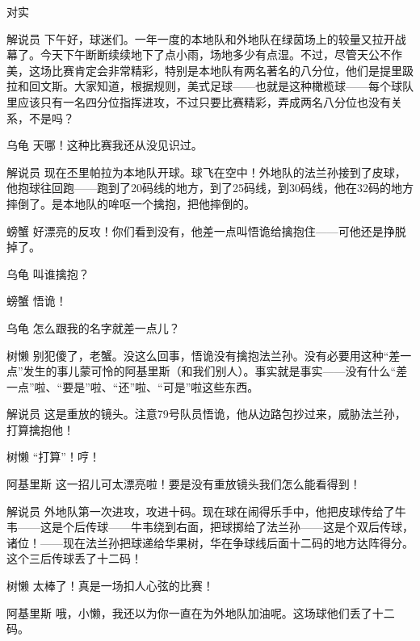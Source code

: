 \begin{dialog}{对实}
\begin{dialogue}
\item[解说员]下午好，球迷们。一年一度的本地队和外地队在绿茵场上的较量又拉开战幕了。今天下午断断续续地下了点小雨，场地多少有点湿。不过，尽管天公不作美，这场比赛肯定会非常精彩，特别是本地队有两名著名的八分位，他们是提里趿拉和回文斯。大家知道，根据规则，美式足球——也就是这种橄榄球——每个球队里应该只有一名四分位指挥进攻，不过只要比赛精彩，弄成两名八分位也没有关系，不是吗？

\item[乌龟]天哪！这种比赛我还从没见识过。

\item[解说员]现在丕里帕拉为本地队开球。球飞在空中！外地队的法兰孙接到了皮球，他抱球往回跑——跑到了20码线的地方，到了25码线，到30码线，他在32码的地方摔倒了。是本地队的哞呕一个擒抱，把他摔倒的。

\item[螃蟹]好漂亮的反攻！你们看到没有，他差一点叫悟诡给擒抱住——可他还是挣脱掉了。

\item[乌龟]叫谁擒抱？

\item[螃蟹]悟诡！

\item[乌龟]怎么跟我的名字就差一点儿？

\item[树懒]别犯傻了，老蟹。没这么回事，悟诡没有擒抱法兰孙。没有必要用这种“差一点”发生的事儿蒙可怜的阿基里斯（和我们别人）。事实就是事实——没有什么“差一点”啦、“要是”啦、“还”啦、“可是”啦这些东西。

\item[解说员]这是重放的镜头。注意79号队员悟诡，他从边路包抄过来，威胁法兰孙，打算擒抱他！

\item[树懒]“打算”！哼！

\item[阿基里斯]这一招儿可太漂亮啦！要是没有重放镜头我们怎么能看得到！

\item[解说员]外地队第一次进攻，攻进十码。现在球在闹得乐手中，他把皮球传给了牛韦——这是个后传球——牛韦绕到右面，把球掷给了法兰孙——这是个双后传球，诸位！——现在法兰孙把球递给华果树，华在争球线后面十二码的地方达阵得分。这个三后传球丢了十二码！

\item[树懒]太棒了！真是一场扣人心弦的比赛！

\item[阿基里斯]哦，小懒，我还以为你一直在为外地队加油呢。这场球他们丢了十二码。


\end{dialogue}
\end{dialog}
